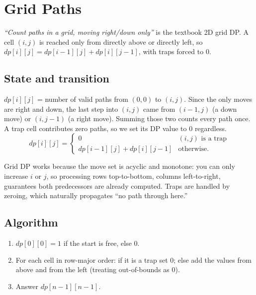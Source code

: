 \section{Grid Paths}
\label{sec:cses-grid-paths}


\begin{patternbox}
\emph{``Count paths in a grid, moving right/down only''} is the textbook
2D grid DP. A cell $(i,j)$ is reached only from directly above or
directly left, so $\textit{dp}[i][j]=\textit{dp}[i-1][j]+
\textit{dp}[i][j-1]$, with traps forced to $0$.
\end{patternbox}

\subsection*{State and transition}

$\textit{dp}[i][j]$ = number of valid paths from $(0,0)$ to $(i,j)$.
Since the only moves are right and down, the last step into $(i,j)$ came
from $(i-1,j)$ (a down move) or $(i,j-1)$ (a right move). Summing those
two counts every path once. A trap cell contributes zero paths, so we
set its DP value to $0$ regardless.
\[
  \textit{dp}[i][j]=\begin{cases}0 & (i,j)\text{ is a trap}\\
  \textit{dp}[i-1][j]+\textit{dp}[i][j-1] & \text{otherwise.}\end{cases}
\]

\begin{ideabox}
Grid DP works because the move set is acyclic and monotone: you can only
increase $i$ or $j$, so processing rows top-to-bottom, columns
left-to-right, guarantees both predecessors are already computed. Traps
are handled by zeroing, which naturally propagates ``no path through
here.''
\end{ideabox}

\subsection*{Algorithm}

\begin{enumerate}
  \item $\textit{dp}[0][0]=1$ if the start is free, else $0$.
  \item For each cell in row-major order: if it is a trap set $0$; else
        add the values from above and from the left (treating
        out-of-bounds as $0$).
  \item Answer $\textit{dp}[n-1][n-1]$.
\end{enumerate}

